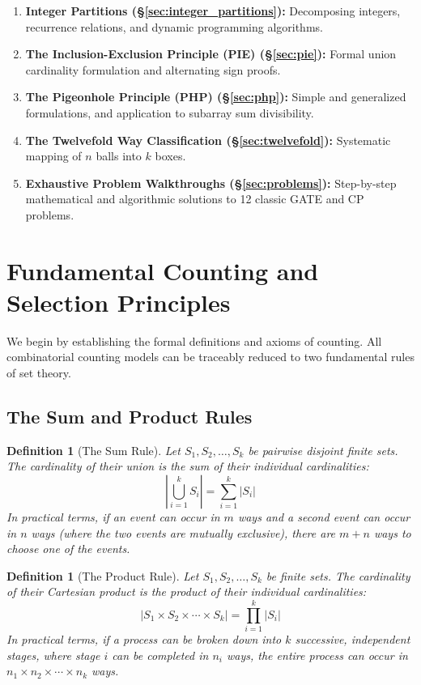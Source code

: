 \documentclass[10pt,journal,compsoc,onecolumn]{IEEEtran}
\newtheorem{definition}[theorem]{Definition}
\begin{document}
\begin{enumerate}
    \item \textbf{Integer Partitions (\S\ref{sec:integer_partitions}):} Decomposing integers, recurrence relations, and dynamic programming algorithms.
    \item \textbf{The Inclusion-Exclusion Principle (PIE) (\S\ref{sec:pie}):} Formal union cardinality formulation and alternating sign proofs.
    \item \textbf{The Pigeonhole Principle (PHP) (\S\ref{sec:php}):} Simple and generalized formulations, and application to subarray sum divisibility.
    \item \textbf{The Twelvefold Way Classification (\S\ref{sec:twelvefold}):} Systematic mapping of $n$ balls into $k$ boxes.
    \item \textbf{Exhaustive Problem Walkthroughs (\S\ref{sec:problems}):} Step-by-step mathematical and algorithmic solutions to 12 classic GATE and CP problems.
\end{enumerate}

\section{Fundamental Counting and Selection Principles}
\label{sec:counting}

We begin by establishing the formal definitions and axioms of counting. All combinatorial counting models can be traceably reduced to two fundamental rules of set theory.

\subsection{The Sum and Product Rules}

\begin{definition}[The Sum Rule]
Let $S_1, S_2, \ldots, S_k$ be pairwise disjoint finite sets. The cardinality of their union is the sum of their individual cardinalities:
\begin{equation}
\left| \bigcup_{i=1}^{k} S_i \right| = \sum_{i=1}^{k} |S_i|
\end{equation}
In practical terms, if an event can occur in $m$ ways and a second event can occur in $n$ ways (where the two events are mutually exclusive), there are $m+n$ ways to choose one of the events.
\end{definition}

\begin{definition}[The Product Rule]
Let $S_1, S_2, \ldots, S_k$ be finite sets. The cardinality of their Cartesian product is the product of their individual cardinalities:
\begin{equation}
|S_1 \times S_2 \times \cdots \times S_k| = \prod_{i=1}^{k} |S_i|
\end{equation}
In practical terms, if a process can be broken down into $k$ successive, independent stages, where stage $i$ can be completed in $n_i$ ways, the entire process can occur in $n_1 \times n_2 \times \cdots \times n_k$ ways.
\end{definition}
\end{document}
